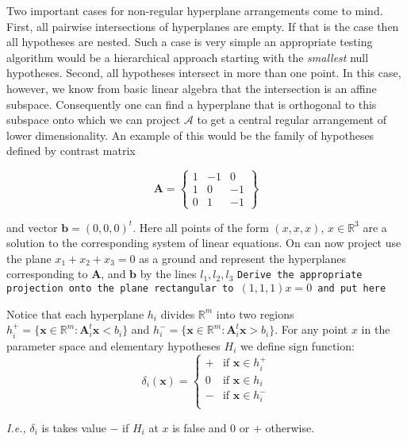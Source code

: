 \documentclass[a4paper,12pt]{article}
\newcommand{\bs}[1]{\boldsymbol{#1}}
\newcommand{\R}{\mathbb{R}}
\begin{document}
Two important cases for non-regular hyperplane arrangements come to
mind. First, all pairwise intersections of hyperplanes are empty. If
that is the case then all hypotheses are nested. Such a case is very
simple an appropriate testing algorithm would be a hierarchical
approach starting with the {\em smallest} null hypotheses. Second, all
hypotheses intersect in more than one point. In this case, however, we
know from basic linear algebra that the intersection is an affine
subspace. Consequently one can find a hyperplane that is orthogonal to
this subspace onto which we can project $\mathscr{A}$ to get a central
regular arrangement of lower dimensionality. An example of this would
be the family of hypotheses defined by contrast matrix

\begin{equation}
  \label{eq:example:ordered}
  \bs{A} = \left\{
    \begin{array}{ccc}
      1 & -1 & 0 \\
      1 & 0 & -1 \\
      0 & 1 & -1 
    \end{array}
  \right\}
\end{equation}

and vector $\bs{b} = (0,0,0)^t$. Here all points of the form $(x,x,x)$, $x
\in \R^3$ are a solution to the corresponding system of linear
equations. On can now project use the plane $x_1 + x_2 + x_3 = 0$ as a
ground and represent the hyperplanes corresponding to $\bs{A}$, and
$\bs{b}$ by the lines $l_1,l_2,l_3$
{\tt Derive the appropriate projection onto the plane rectangular to
  $(1,1,1)x=0$ and put here}


Notice that each hyperplane $h_i$ divides
$\mathbb{R}^m$ into two regions $h_i^+ = \{\bs{x} \in \mathbb{R}^m:
\bs{A}_i^t\bs{x} < b_i\}$ and $h_i^- = \{\bs{x} \in \mathbb{R}^m: \bs{A}_i^t\bs{x} >
b_i\}$. For any point $x$ in the parameter space and elementary
hypotheses $H_i$ we define sign function: 
\begin{equation}
  \label{eq:sign}
  \delta_i(\bs{x}) = \left\{
\begin{array}{ll}
  + & \text{if } \bs{x} \in h_i^+\\
  0 & \text{if } \bs{x} \in h_i \\
  - & \text{if } \bs{x} \in h_i^-\\
\end{array}\right.
\end{equation}

{\em I.e.,} $\delta_i$ is takes value $-$ if $H_i$ at $x$ is false and
$0$ or $+$ otherwise.
\end{document}
